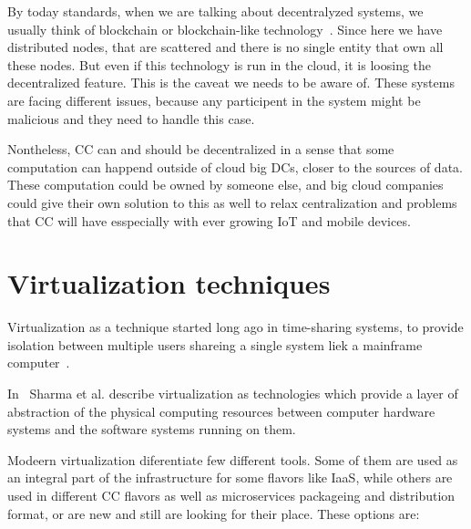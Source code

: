 By today standards, when we are talking about decentralyzed systems, we usually think of blockchain or blockchain-like technology~\cite{LeibleSSG19}. Since here we have distributed nodes, that are scattered and there is no single entity that own all these nodes. But even if this technology is run in the cloud, it is loosing the decentralized feature. This is the caveat we needs to be aware of. These systems are facing different issues, because any participent in the system might be malicious and they need to handle this case. 

Nontheless, CC can and should be decentralized in a sense that some computation can happend outside of cloud big DCs, closer to the sources of data. These computation could be owned by someone else, and big cloud companies could give their own solution to this as well to relax centralization and problems that CC will have esspecially with ever growing IoT and mobile devices.
%
%
\section{Virtualization techniques}\label{sec:virtualization_techniques}
%
Virtualization as a technique started long ago in time-sharing systems, to provide isolation between multiple users shareing a single system liek a mainframe computer~\cite{CrosbyB06}. 

In~\cite{Sharma} Sharma et al. describe virtualization as technologies which provide a layer of abstraction of the physical computing resources between computer hardware systems and the software systems running on them.

Modeern virtualization diferentiate few different tools. Some of them are used as an integral part of the infrastructure for some flavors like IaaS, while others are used in different CC flavors as well as microservices packageing and distribution format, or are new and still are looking for their place. These options are:

